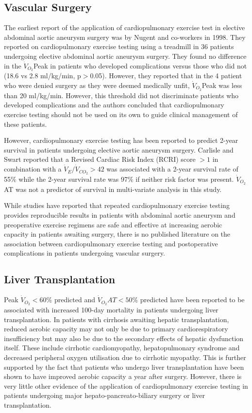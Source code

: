 \subsection{Vascular Surgery}
The earliest report of the application of cardiopulmonary exercise test in elective abdominal aortic aneurysm surgery was by Nugent and co-workers in 1998. They reported on cardiopulmonary exercise testing using a treadmill in 36 patients undergoing elective abdominal aortic aneurysm surgery. They found no difference in the $\dot{V}_{O_2}$Peak in patients who developed complications versus those who did not (18.6 vs 2.8 ml/kg/min, p$>$0.05). However, they reported that in the 4 patient who were denied surgery as they were deemed medically unfit, $\dot{V}_{O_2}$Peak was less than 20 ml/kg/min. However, this threshold did not discriminate patients who developed complications and the authors concluded that cardiopulmonary exercise testing should not be used on its own to guide clinical management of these patients.\parencite{nugent_cardiopulmonary_1998}

However, cardiopulmonary exercise testing has been reported to predict 2-year survival in patients undergoing elective aortic aneurysm surgery. Carlisle and Swart reported that a Revised Cardiac Risk Index (RCRI) score $>1$ in combination with a $\dot{V}_E/\dot{V}_{CO_2}>42$ was associated with a 2-year survival rate of 55\% while the 2-year survival rate was 97\% if neither risk factor was present. $\dot{V}_{O_2}$AT was not a predictor of survival in multi-variate analysis in this study.\parencite{carlisle_mid-term_2007}

While studies have reported that repeated cardiopulmonary exercise testing provides reproducible results in patients with abdominal aortic aneurysm and preoperative exercise regimens are safe and effective at increasing aerobic capacity in patients awaiting surgery, there is no published literature on the association between cardiopulmonary exercise testing and postoperative complications in patients undergoing vascular surgery. %

\subsection{Liver Transplantation}
Peak $\dot{V}_{O_2}<60\%$ predicted and $\dot{V}_{O_2}AT<50\%$ predicted have been reported to be associated with increased 100-day mortality in patients undergoing liver transplantation. In patients with cirrhosis awaiting hepatic transplantation, reduced aerobic capacity may not only be due to primary cardiorespiratory insufficiency but may also be due to the secondary effects of hepatic dysfunction itself. These include cirrhotic cardiomyopathy, hepatopulmonary syndrome and decreased peripheral oxygen utilisation due to cirrhotic myopathy.\parencite{epstein_aerobic_2004} This is further supported by the fact that patients who undergo liver transplantation have been shown to have improved aerobic capacity a year after surgery. \parencite{iscar_functional_2009} However, there is very little other evidence of the application of cardiopulmonary exercise testing in patients undergoing major hepato-pancreato-biliary surgery or liver transplantation.

